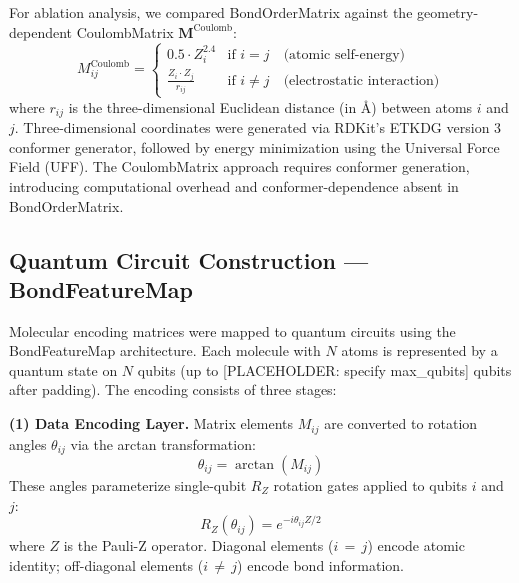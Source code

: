 For ablation analysis, we compared BondOrderMatrix against the geometry-dependent CoulombMatrix $\mathbf{M}^{\text{Coulomb}}$:\cite{Rupp2012CoulombMatrix}
%
\begin{equation}
M^{\text{Coulomb}}_{ij} = 
\begin{cases}
0.5 \cdot Z_i^{2.4} & \text{if } i = j \quad \text{(atomic self-energy)} \\
\frac{Z_i \cdot Z_j}{r_{ij}} & \text{if } i \neq j \quad \text{(electrostatic interaction)}
\end{cases}
\label{eq:coulombmatrix}
\end{equation}
%
where $r_{ij}$ is the three-dimensional Euclidean distance (in \AA) between atoms $i$ and $j$. Three-dimensional coordinates were generated via RDKit's ETKDG version 3 conformer generator,\cite{RDKit2023} followed by energy minimization using the Universal Force Field (UFF). The CoulombMatrix approach requires conformer generation, introducing computational overhead and conformer-dependence absent in BondOrderMatrix.

\subsection{Quantum Circuit Construction — BondFeatureMap}
\label{sec:methods:circuits}

Molecular encoding matrices were mapped to quantum circuits using the BondFeatureMap architecture.\cite{Boy2025QMSE} Each molecule with $N$ atoms is represented by a quantum state on $N$ qubits (up to [PLACEHOLDER: specify max\_qubits] qubits after padding). The encoding consists of three stages:

\textbf{(1) Data Encoding Layer.} Matrix elements $M_{ij}$ are converted to rotation angles $\theta_{ij}$ via the arctan transformation:
%
\begin{equation}
\theta_{ij} = \arctan(M_{ij})
\end{equation}
%
These angles parameterize single-qubit $R_Z$ rotation gates applied to qubits $i$ and $j$:
%
\begin{equation}
R_Z(\theta_{ij}) = e^{-i \theta_{ij} Z / 2}
\end{equation}
%
where $Z$ is the Pauli-Z operator. Diagonal elements ($i\,=\,j$) encode atomic identity; off-diagonal elements ($i\,\neq\,j$) encode bond information.

